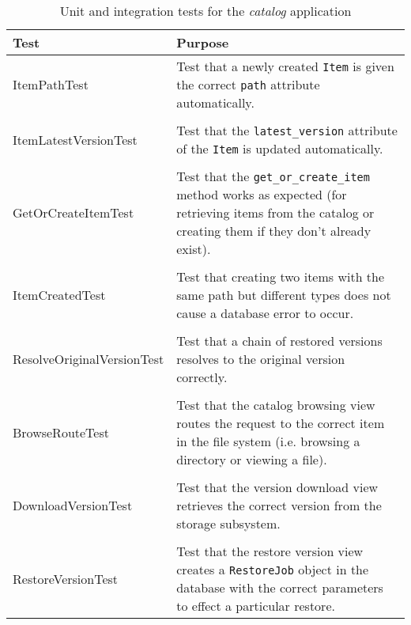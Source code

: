 \begin{table}[H]
    \centering
    \begin{tabular}{ l  p{7cm} }
        \toprule
        Test                        & Purpose
        \\ \midrule
        ItemPathTest                & Test that a newly created \verb!Item!
                                      is given the correct \verb!path!
                                      attribute automatically.
        \\ \\
        ItemLatestVersionTest       & Test that the \verb!latest_version!
                                      attribute of the \verb!Item! is updated
                                      automatically.
        \\ \\
        GetOrCreateItemTest         & Test that the \verb!get_or_create_item!
                                      method works as expected (for retrieving
                                      items from the catalog or creating them
                                      if they don't already exist).
        \\ \\
        ItemCreatedTest             & Test that creating two items with the
                                      same path but different types does not
                                      cause a database error to occur.
        \\ \\
        ResolveOriginalVersionTest  & Test that a chain of restored versions
                                      resolves to the original version
                                      correctly.
        \\ \\
        BrowseRouteTest             & Test that the catalog browsing view
                                      routes the request to the correct item in
                                      the file system (i.e. browsing
                                      a directory or viewing a file).
        \\ \\
        DownloadVersionTest         & Test that the version download view
                                      retrieves the correct version from the
                                      storage subsystem.
        \\ \\
        RestoreVersionTest          & Test that the restore version view
                                      creates a \verb!RestoreJob! object in the
                                      database with the correct parameters to
                                      effect a particular restore.
        \\ \bottomrule
    \end{tabular}
    \caption{Unit and integration tests for the \emph{catalog} application}
    \label{tab:tests-catalog}
\end{table}

